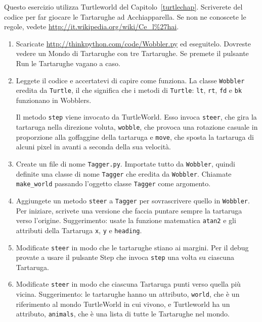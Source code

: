 \documentclass[10pt]{book}
\begin{document}
\vspace{0.2in}
\begin{exercise}

Questo esercizio utilizza Turtleworld del Capitolo~\ref{turtlechap}.
Scriverete del codice per far giocare le Tartarughe ad Acchiapparella. Se non ne conoscete le regole, vedete \url{http://it.wikipedia.org/wiki/Ce_l%27hai}.

\begin{enumerate}

\item Scaricate \url{http://thinkpython.com/code/Wobbler.py} ed eseguitelo. Dovreste vedere un Mondo di Tartarughe con tre Tartarughe. Se premete il pulsante {\sf Run} le Tartarughe vagano a caso.

\item Leggete il codice e accertatevi di capire come funziona. La classe {\tt Wobbler} eredita da {\tt Turtle}, il che significa che i metodi di {\tt Turtle}: {\tt lt}, {\tt rt}, {\tt fd} e {\tt bk} funzionano in Wobblers.

Il metodo {\tt step} viene invocato da TurtleWorld. Esso invoca 
{\tt steer}, che gira la tartaruga nella direzione voluta,
{\tt wobble}, che provoca una rotazione casuale in proporzione alla goffaggine della tartaruga e {\tt move}, che sposta la tartaruga di alcuni pixel in avanti a seconda della sua velocità.

\item Create un file di nome {\tt Tagger.py}.  Importate tutto da
  {\tt Wobbler}, quindi definite una classe di nome {\tt Tagger} che eredita da {\tt Wobbler}.  Chiamate \verb"make_world" passando l'oggetto classe {\tt Tagger} come argomento.

\item Aggiungete un metodo {\tt steer} a {\tt Tagger} per sovrascrivere quello in  {\tt Wobbler}.  Per iniziare, scrivete una versione che faccia puntare sempre la tartaruga verso l'origine. Suggerimento: usate la funzione matematica  {\tt atan2} e gli attributi della Tartaruga {\tt x}, {\tt y} e {\tt heading}.

\item Modificate {\tt steer} in modo che le tartarughe stiano ai margini. Per il debug provate a usare il pulsante {\sf Step} che invoca {\tt step} una volta su ciascuna Tartaruga.

\item Modificate {\tt steer} in modo che ciascuna Tartaruga punti verso quella più vicina. Suggerimento: le tartarughe hanno un attributo, {\tt world}, che è un riferimento al mondo TurtleWorld in cui vivono, e Turtleworld ha un attributo, {\tt animals}, che è una lista di tutte le Tartarughe nel mondo.


\end{enumerate}
\end{exercise}
\end{document}
